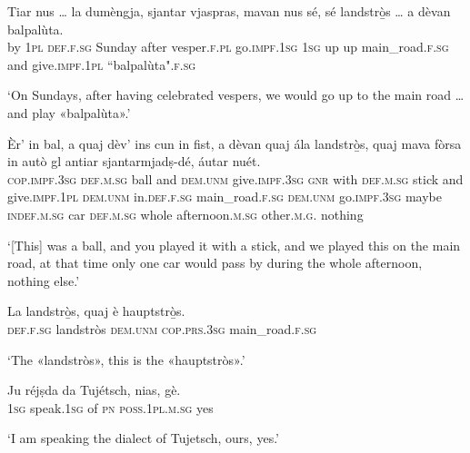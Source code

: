 \begin{linenumbers}
\gll    Tiar nus … la dumèngja, sjantar vjaspras, mavan nus sé, sé  landstrò̱s … a dèvan balpalùta.\\
by \textsc{1pl} {} \textsc{def.f.sg} Sunday  after vesper.\textsc{f.pl} go.\textsc{impf.1sg} \textsc{1sg} up up main\_road.\textsc{f.sg} {} and give.\textsc{impf.1pl} “balpalùta".\textsc{f.sg}\\
\end{linenumbers}
\medskip
\glt `On Sundays, after having celebrated vespers, we would go up to the main road … and play «balpalùta».'
\medskip

\begin{linenumbers}
\gll    Èr’ in bal, a quaj dèv’ ins cun in fist, a dèvan quaj ála  landstrò̱s, quaj mava fòrsa in autò gl antiar sjantarmjadṣ-dé, áutar nuét.\\
 \textsc{cop.impf.3sg} \textsc{def.m.sg} ball and \textsc{dem.unm} give.\textsc{impf.3sg} \textsc{gnr} with \textsc{def.m.sg} stick and give.\textsc{impf.1pl} \textsc{dem.unm} in.\textsc{def.f.sg} main\_road.\textsc{f.sg}  \textsc{dem.unm} go.\textsc{impf.3sg} maybe \textsc{indef.m.sg} car \textsc{def.m.sg} whole afternoon.\textsc{m.sg} other.\textsc{m.g.} nothing\\
\end{linenumbers}
\medskip
\glt `[This] was a ball, and you played it with a stick, and we played this on the main road, at that time only one car would pass by during the whole afternoon, nothing else.'
\medskip


\begin{linenumbers}
\gll La landstrò̱s, quaj è hauptstrò̱s.\footnotemark\\
 \textsc{def.f.sg} landstròs \textsc{dem.unm} \textsc{cop.prs.3sg} main\_road.\textsc{f.sg}\\
\end{linenumbers}
\medskip
\glt `The «landstròs», this is the «hauptstròs».'
\medskip

\begin{linenumbers}
\gll   Ju réjṣda da Tujétsch, nias, gè. \\
\textsc{1sg} speak.\textsc{1sg} of \textsc{pn} \textsc{poss.1pl.m.sg} yes  \\
\end{linenumbers}
\medskip
\glt `I am speaking the dialect of Tujetsch, ours, yes.'
\medskip

